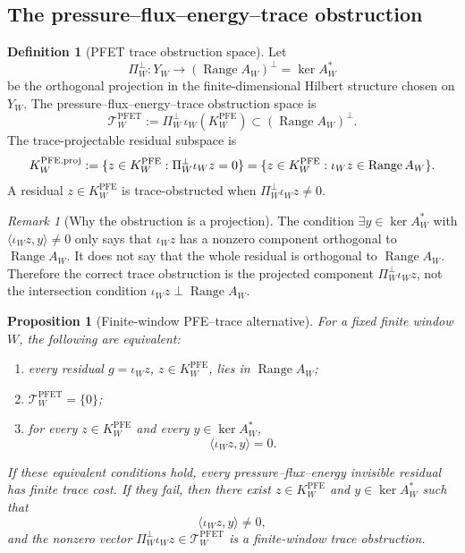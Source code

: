 \documentclass[11pt]{article}
\numberwithin{equation}{section}
\theoremstyle{plain}
\newtheorem{proposition}[theorem]{Proposition}
\theoremstyle{definition}
\newtheorem{definition}[theorem]{Definition}
\theoremstyle{remark}
\newtheorem{remark}[theorem]{Remark}
\newcommand{\PFE}{\mathrm{PFE}}
\newcommand{\PFET}{\mathrm{PFET}}
\begin{document}
\subsection{The pressure--flux--energy--trace obstruction}

\begin{definition}[PFET trace obstruction space]
\label{def:pfet-kernel-clean}
Let
\[
        \Pi_W^\perp:Y_W\longrightarrow (\operatorname{Range}A_W)^\perp
        =\ker A_W^*
\]
be the orthogonal projection in the finite-dimensional Hilbert structure chosen
on \(Y_W\).  The pressure--flux--energy--trace obstruction space is
\begin{equation}
        \mathcal T_W^{\PFET}
        :=
        \Pi_W^\perp\,\iota_W(K_W^{\PFE})
        \subset (\operatorname{Range}A_W)^\perp .
        \label{eq:pfet-obstruction-space}
\end{equation}
The trace-projectable residual subspace is
\begin{equation}
        K^{\PFE,{\rm proj}}_W
        :=
        \{z\in K_W^{\PFE}:\Pi_W^\perp\iota_Wz=0\}
        =
        \{z\in K_W^{\PFE}:\iota_Wz\in\operatorname{Range}A_W\}.
        \label{eq:pfe-projectable-residuals}
\end{equation}
A residual \(z\in K_W^{\PFE}\) is trace-obstructed when
\(\Pi_W^\perp\iota_Wz\ne0\).
\end{definition}

\begin{remark}[Why the obstruction is a projection]
The condition
\(\exists y\in\ker A_W^*\) with \(\langle\iota_Wz,y\rangle\ne0\)
only says that \(\iota_Wz\) has a nonzero component orthogonal to
\(\operatorname{Range}A_W\).  It does not say that the whole residual is
orthogonal to \(\operatorname{Range}A_W\).  Therefore the correct trace
obstruction is the projected component \(\Pi_W^\perp\iota_Wz\), not the
intersection condition \(\iota_Wz\perp\operatorname{Range}A_W\).
\end{remark}

\begin{proposition}[Finite-window PFE--trace alternative]
\label{prop:pfe-trace-alternative-clean}
For a fixed finite window \(W\), the following are equivalent:
\begin{enumerate}
\item every residual \(g=\iota_Wz\), \(z\in K_W^{\PFE}\), lies in
\(\operatorname{Range}A_W\);
\item \(\mathcal T_W^{\PFET}=\{0\}\);
\item for every \(z\in K_W^{\PFE}\) and every \(y\in\ker A_W^*\),
\[
        \langle \iota_Wz,y\rangle=0.
\]
\end{enumerate}
If these equivalent conditions hold, every pressure--flux--energy invisible
residual has finite trace cost.  If they fail, then there exist
\(z\in K_W^{\PFE}\) and \(y\in\ker A_W^*\) such that
\[
        \langle \iota_Wz,y\rangle\ne0,
\]
and the nonzero vector \(\Pi_W^\perp\iota_Wz\in\mathcal T_W^{\PFET}\) is a
finite-window trace obstruction.
\end{proposition}
\end{document}
